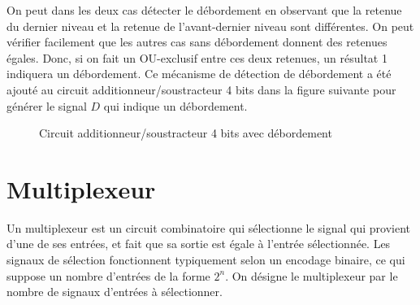 \documentclass[letter, oneside]{book}
\begin{document}
\begin{enumerate}
On peut dans les deux cas détecter le débordement en observant que la
retenue du dernier niveau et la retenue de l'avant-dernier niveau sont
différentes. On peut vérifier facilement que les autres cas sans
débordement donnent des retenues égales. Donc, si on fait un
OU-exclusif entre ces deux retenues, un résultat 1 indiquera un
débordement. Ce mécanisme de détection de débordement a été ajouté au
circuit additionneur/soustracteur 4 bits dans la figure suivante pour
générer le signal \(D\) qui indique un débordement.

\begin{figure}[htbp]
\centering

\caption{\label{fig:org51da7ec}Circuit additionneur/soustracteur 4 bits avec débordement}
\end{figure}
\end{enumerate}


\section{Multiplexeur}
\label{sec:orgd4ec199}

Un multiplexeur est un circuit combinatoire qui sélectionne le signal
qui provient d'une de ses entrées, et fait que sa sortie est égale à
l'entrée sélectionnée. Les signaux de sélection fonctionnent
typiquement selon un encodage binaire, ce qui suppose un nombre
d'entrées de la forme \(2^n\). On désigne le multiplexeur par le
nombre de signaux d'entrées à sélectionner.
\end{document}
